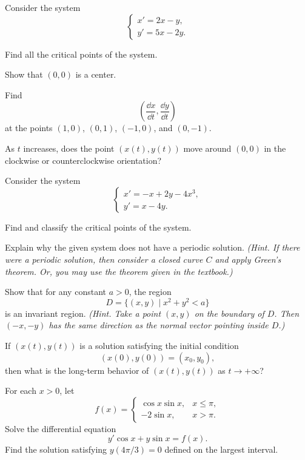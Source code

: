 \documentclass[11pt,oneside]{article}
\begin{document}
\begin{problem}
Consider the system
\[
\begin{cases}
x'=2x-y,\\
y'=5x-2y.
\end{cases}
\]
\begin{problemsubparts}
\item Find all the critical points of the system.
\item Show that $(0,0)$ is a center.
\item Find
\[
\left(\frac{\dd x}{\dd t},\frac{\dd y}{\dd t}\right)
\]
at the points $(1,0)$, $(0,1)$, $(-1,0)$, and $(0,-1)$.
\item As $t$ increases, does the point $(x(t),y(t))$ move around $(0,0)$ in the clockwise or counterclockwise orientation?
\end{problemsubparts}
\end{problem}

\begin{problem}
Consider the system
\[
\begin{cases}
x'=-x+2y-4x^3,\\
y'=x-4y.
\end{cases}
\]
\begin{problemsubparts}
\item Find and classify the critical points of the system.
\item Explain why the given system does not have a periodic solution. \textit{(Hint. If there were a periodic solution, then consider a closed curve $C$ and apply Green's theorem. Or, you may use the theorem given in the textbook.)}
\item Show that for any constant $a>0$, the region
\[
D=\{(x,y)\mid x^2+y^2<a\}
\]
is an invariant region. \textit{(Hint. Take a point $(x,y)$ on the boundary of $D$. Then $(-x,-y)$ has the same direction as the normal vector pointing inside $D$.)}
\item If $(x(t),y(t))$ is a solution satisfying the initial condition
\[
(x(0),y(0))=(x_0,y_0),
\]
then what is the long-term behavior of $(x(t),y(t))$ as $t\to+\infty$?
\end{problemsubparts}
\end{problem}

\begin{problem}
For each $x>0$, let
\[
f(x)=
\begin{cases}
\cos x\sin x, & x\le\pi,\\
-2\sin x, & x>\pi.
\end{cases}
\]
Solve the differential equation
\[
y'\cos x+y\sin x=f(x).
\]
Find the solution satisfying $y(4\pi/3)=0$ defined on the largest interval.
\end{problem}
\end{document}

